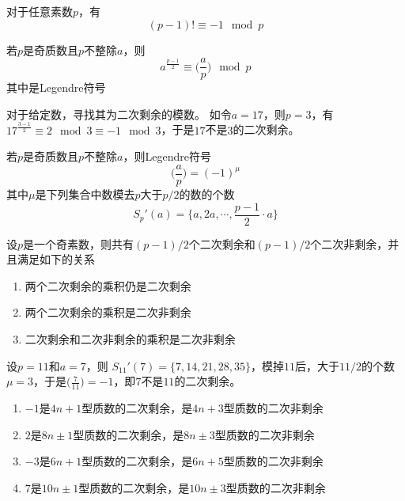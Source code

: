 \begin{theorem}[Wilson定理]
	对于任意素数$p$，有
	\begin{equation*}
		(p-1)!\equiv -1\mod p
	\end{equation*}
\end{theorem}
\begin{theorem}[Euler判别法]
	若$p$是奇质数且$p$不整除$a$，则
	\begin{equation*}
		a^{\frac{p-1}{2}} \equiv\Big(\frac{a}{p}\Big) \mod p
	\end{equation*}
	其中是Legendre符号
\end{theorem}
\begin{example}
	对于给定数，寻找其为二次剩余的模数。
	如令$a = 17$，则$p=3$，有$17^{\frac{3-1}{2}}\equiv 2\mod 3\equiv -1\mod 3$，于是$17$不是$3$的二次剩余。
\end{example}
\begin{theorem}[Gauss引理]
	若$p$是奇质数且$p$不整除$a$，则Legendre符号
	\begin{equation*}
		\Big(\frac{a}{p}\Big) = (-1)^\mu
	\end{equation*}
	其中$\mu$是下列集合中数模去$p$大于$p/2$的数的个数
	\begin{equation*}
		S_p'(a) = \{a, 2a,\cdots, \frac{p-1}{2}\cdot a\}
	\end{equation*}
\end{theorem}
\begin{theorem}
	设$p$是一个奇素数，则共有$(p-1)/2$个二次剩余和$(p-1)/2$个二次非剩余，并且满足如下的关系
	\begin{enumerate}
		\item 两个二次剩余的乘积仍是二次剩余
		\item 两个二次剩余的乘积是二次非剩余
		\item 二次剩余和二次非剩余的乘积是二次非剩余
	\end{enumerate}
\end{theorem}
\begin{example}
	设$p = 11$和$a = 7$，则
	$S_{11}'(7) = \{7, 14,21, 28, 35\}$，模掉$11$后，大于$11/2$的个数$\mu = 3$，于是$\Big(\frac{7}{11}\Big) = -1$，即$7$不是$11$的二次剩余。
\end{example}
\begin{proposition}
	\begin{enumerate}
		\item $-1$是$4n+1$型质数的二次剩余，是$4n+3$型质数的二次非剩余
		\item $2$是$8n\pm 1$型质数的二次剩余，是$8n\pm 3$型质数的二次非剩余
		\item $-3$是$6n+1$型质数的二次剩余，是$6n+5$型质数的二次非剩余
		\item $7$是$10n\pm 1$型质数的二次剩余，是$10n\pm 3$型质数的二次非剩余
	\end{enumerate}
\end{proposition}
